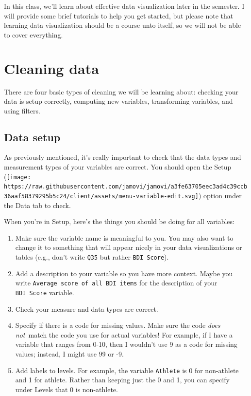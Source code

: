 \documentclass[
]{book}
\begin{document}
In this class, we'll learn about effective data visualization later in the semester. I will provide some brief tutorials to help you get started, but please note that learning data visualization should be a course unto itself, so we will not be able to cover everything.

\hypertarget{cleaning-data}{%
\section{Cleaning data}\label{cleaning-data}}

There are four basic types of cleaning we will be learning about: checking your data is setup correctly, computing new variables, transforming variables, and using filters.

\hypertarget{data-setup}{%
\subsection{Data setup}\label{data-setup}}

As previously mentioned, it's really important to check that the data types and measurement types of your variables are correct. You should open the Setup (\texttt{[image: https://raw.githubusercontent.com/jamovi/jamovi/a3fe63705eec3ad4c39ccb36aaf58379295b5c24/client/assets/menu-variable-edit.svg]}) option under the Data tab to check.

When you're in Setup, here's the things you should be doing for all variables:

\begin{enumerate}
\def\labelenumi{\arabic{enumi}.}
\item
  Make sure the variable name is meaningful to you. You may also want to change it to something that will appear nicely in your data visualizations or tables (e.g., don't write \texttt{Q35} but rather \texttt{BDI\ Score}).
\item
  Add a description to your variable so you have more context. Maybe you write \texttt{Average\ score\ of\ all\ BDI\ items} for the description of your \texttt{BDI\ Score} variable.
\item
  Check your measure and data types are correct.
\item
  Specify if there is a code for missing values. Make sure the code \emph{does not}~match the code you use for actual variables! For example, if I have a variable that ranges from 0-10, then I wouldn't use 9 as a code for missing values; instead, I might use 99 or -9.
\item
  Add labels to levels. For example, the variable \texttt{Athlete} is 0 for non-athlete and 1 for athlete. Rather than keeping just the 0 and 1, you can specify under Levels that 0 is non-athlete.
\end{enumerate}
\end{document}
